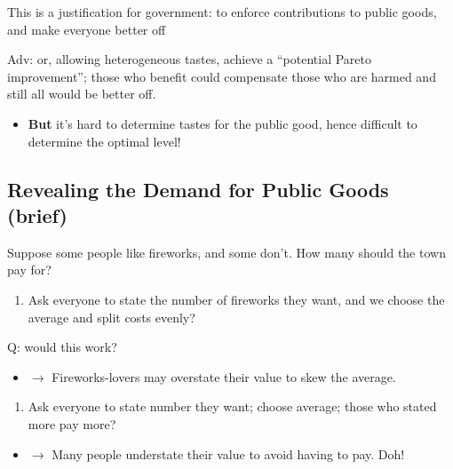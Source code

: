 \documentclass[]{article}
\providecommand{\tightlist}{%
  \setlength{\itemsep}{0pt}\setlength{\parskip}{0pt}}
\begin{document}
This is a justification for government: to enforce contributions to public goods, and make everyone better off

\textcolor{RawSienna}{Adv: or, allowing heterogeneous tastes, achieve a “potential Pareto improvement”; those who benefit could compensate those who are harmed and still all would be better off.}

\begin{itemize}
\tightlist
\item
  \textbf{But} it's hard to determine tastes for the public good, hence difficult to determine the optimal level!
\end{itemize}

\hypertarget{revealing-the-demand-for-public-goods-brief}{%
\subsection{Revealing the Demand for Public Goods (brief)}\label{revealing-the-demand-for-public-goods-brief}}

Suppose some people like fireworks, and some don't. How many should the town pay for?

\begin{enumerate}
\def\labelenumi{\roman{enumi}.}
\tightlist
\item
  Ask everyone to state the number of fireworks they want, and we choose the average and split costs evenly?
\end{enumerate}

Q: would this work?\\

\begin{itemize}
\tightlist
\item
  \(\rightarrow\) Fireworks-lovers may overstate their value to skew the average.
\end{itemize}

\begin{enumerate}
\def\labelenumi{\roman{enumi}.}
\setcounter{enumi}{1}
\tightlist
\item
  Ask everyone to state number they want; choose average; those who stated more pay more?
\end{enumerate}

\begin{itemize}
\tightlist
\item
  \(\rightarrow\) Many people understate their value to avoid having to pay. Doh!
\end{itemize}
\end{document}
